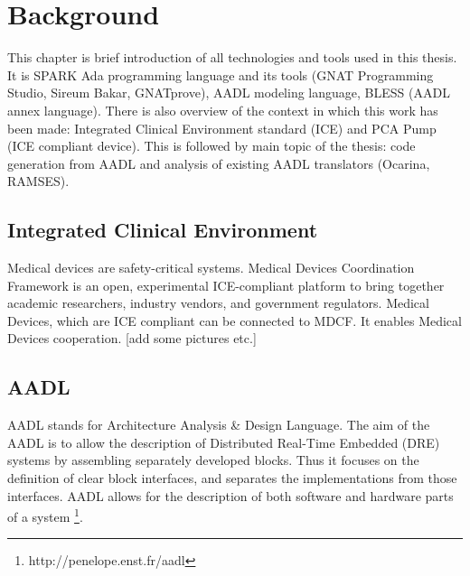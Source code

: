 
\cleardoublepage


\chapter{Background}
\label{background}

This chapter is brief introduction of all technologies and tools used in this thesis. It is SPARK Ada programming language and its tools (GNAT Programming Studio, Sireum Bakar, GNATprove), AADL modeling language, BLESS (AADL annex language). There is also overview of the context in which this work has been made: Integrated Clinical Environment standard (ICE) and PCA Pump (ICE compliant device). This is followed by main topic of the thesis: code generation from AADL and analysis of existing AADL translators (Ocarina, RAMSES).



\section{Integrated Clinical Environment}
\label{background:ice}
Medical devices are safety-critical systems.
Medical Devices Coordination Framework is an open, experimental ICE-compliant platform to bring together academic researchers, industry vendors, and government regulators.
Medical Devices, which are ICE compliant can be connected to MDCF. It enables Medical Devices cooperation.
[add some pictures etc.]



\section{AADL}
\label{background:aadl}

AADL stands for Architecture Analysis \& Design Language. The aim of the AADL is to allow the description of Distributed Real-Time Embedded (DRE) systems by assembling separately developed blocks. Thus it focuses on the definition of clear block interfaces, and separates the implementations from those interfaces. AADL allows for the description of both software and hardware parts of a system \footnote{http://penelope.enst.fr/aadl}. 

